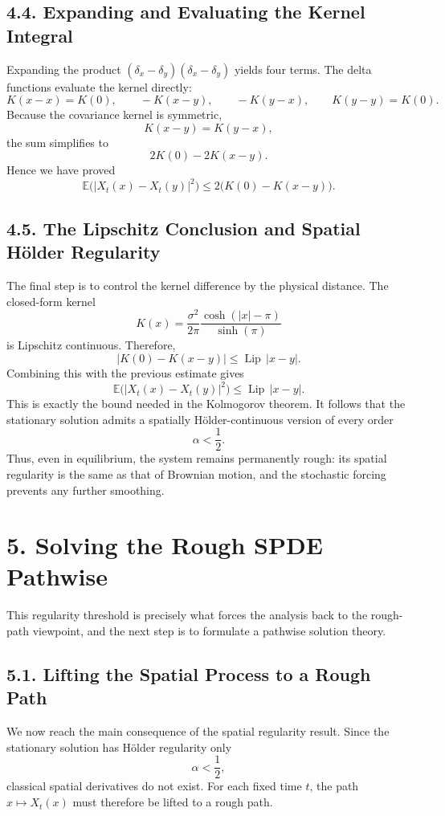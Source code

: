 \documentclass[11pt]{article}
\theoremstyle{definition}
\theoremstyle{remark}
\begin{document}
\subsection*{4.4. Expanding and Evaluating the Kernel Integral}
Expanding the product \((\delta_x-\delta_y)(\delta_x-\delta_y)\) yields four terms. The delta functions evaluate the kernel directly:
\[
K(x-x)=K(0),
\qquad
-K(x-y),
\qquad
-K(y-x),
\qquad
K(y-y)=K(0).
\]
Because the covariance kernel is symmetric,
\[
K(x-y)=K(y-x),
\]
the sum simplifies to
\[
2K(0)-2K(x-y).
\]
Hence we have proved
\[
\mathbb E\bigl(|X_t(x)-X_t(y)|^2\bigr)
\le
2\bigl(K(0)-K(x-y)\bigr).
\]

\subsection*{4.5. The Lipschitz Conclusion and Spatial Hölder Regularity}
The final step is to control the kernel difference by the physical distance. The closed-form kernel
\[
K(x)=\frac{\sigma^2}{2\pi}\frac{\cosh(|x|-\pi)}{\sinh(\pi)}
\]
is Lipschitz continuous. Therefore,
\[
|K(0)-K(x-y)|
\le
\operatorname{Lip}\,|x-y|.
\]
Combining this with the previous estimate gives
\[
\mathbb E\bigl(|X_t(x)-X_t(y)|^2\bigr)
\le
\operatorname{Lip}\,|x-y|.
\]
This is exactly the bound needed in the Kolmogorov theorem. It follows that the stationary solution admits a spatially Hölder-continuous version of every order
\[
\alpha<\frac12.
\]
Thus, even in equilibrium, the system remains permanently rough: its spatial regularity is the same as that of Brownian motion, and the stochastic forcing prevents any further smoothing.

\section*{5. Solving the Rough SPDE Pathwise}
This regularity threshold is precisely what forces the analysis back to the rough-path viewpoint, and the next step is to formulate a pathwise solution theory.

\subsection*{5.1. Lifting the Spatial Process to a Rough Path}
We now reach the main consequence of the spatial regularity result. Since the stationary solution has Hölder regularity only
\[
\alpha<\frac12,
\]
classical spatial derivatives do not exist. For each fixed time \(t\), the path \(x\mapsto X_t(x)\) must therefore be lifted to a rough path.
\end{document}
